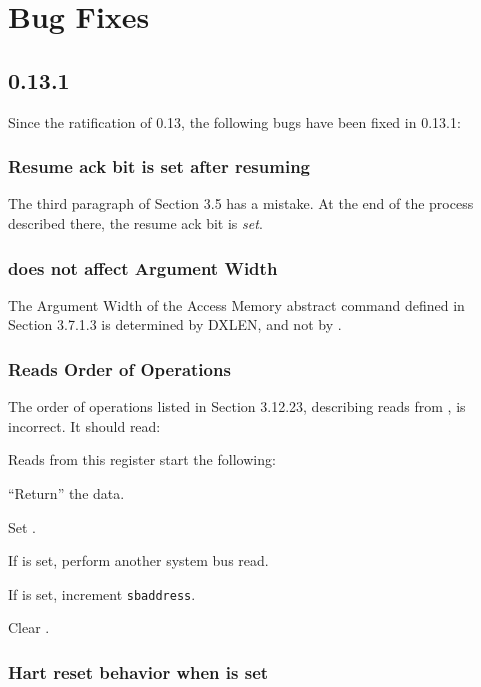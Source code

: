 \chapter{Bug Fixes}

\section{0.13.1}

Since the ratification of 0.13, the following bugs have been fixed in 0.13.1:

\subsection{Resume ack bit is set after resuming}

The third paragraph of Section 3.5 has a mistake. At the end of the process
described there, the resume ack bit is \emph{set}.

\subsection{\Faamsize does not affect Argument Width}

The Argument Width of the Access Memory abstract command defined in Section
3.7.1.3 is determined by DXLEN, and not by \Faamsize.

\subsection{\Rsbdatazero Reads Order of Operations}

The order of operations listed in Section 3.12.23, describing reads from
\Rsbdatazero, is incorrect. It should read:

\begin{steps}{Reads from this register start the following:}
    \item ``Return'' the data.
    \item Set \Fsbbusy.
    \item If \Fsbreadondata is set, perform another system bus read.
    \item If \Fsbautoincrement is set, increment {\tt sbaddress}.
    \item Clear \Fsbbusy.
\end{steps}

\subsection{Hart reset behavior when \Fhaltreq is set}

